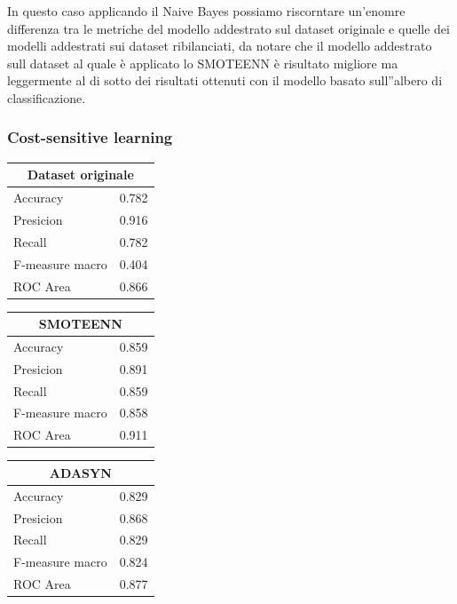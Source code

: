 \documentclass[italian,12pt,a4paper]{article}
\begin{document}
	In questo caso applicando il Naive Bayes possiamo riscorntare un'enomre differenza tra le metriche del modello addestrato sul dataset originale e quelle dei modelli addestrati sui dataset ribilanciati, da notare che il modello addestrato sull dataset al quale è applicato lo SMOTEENN è risultato migliore ma leggermente al di sotto dei risultati ottenuti con il modello basato sull''albero di classificazione. \\
	\linebreak
	\linebreak
	
	\subsubsection{Cost-sensitive learning}
	\begin{center}
		\quad
		\begin{table}[h]
			\footnotesize
			\begin{tabular}{|p{2cm}|c|}
				\hline
				\multicolumn{2}{|c|}{Dataset originale}\\ \hline
				Accuracy & 0.782 \\ \hline
				Presicion & 0.916 \\ \hline
				Recall & 0.782 \\ \hline
				F-measure macro & 0.404 \\ \hline
				ROC Area & 0.866 \\ \hline  
				\end{tabular}
				\hfill
				\begin{tabular}{|p{2cm}|c|}
				\hline
				\multicolumn{2}{|c|}{SMOTEENN}\\ \hline
				Accuracy & 0.859 \\ \hline
				Presicion & 0.891 \\ \hline
				Recall & 0.859 \\ \hline
				F-measure macro & 0.858 \\ \hline
				ROC Area & 0.911 \\ \hline  
				\end{tabular}
					\hfill
			\begin{tabular}{|p{2cm}|r|} \hline
				\multicolumn{2}{|c|}{ADASYN}\\ \hline
				Accuracy & 0.829 \\ \hline
				Presicion & 0.868 \\ \hline
				Recall & 0.829 \\ \hline
				F-measure macro & 0.824 \\ \hline
				ROC Area & 0.877 \\ \hline  

\end{tabular}
\end{table}
\end{center}
\end{document}
